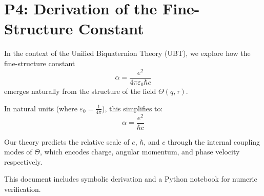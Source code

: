 \documentclass{article}
\begin{document}
\section*{P4: Derivation of the Fine-Structure Constant}

In the context of the Unified Biquaternion Theory (UBT), we explore how the fine-structure constant
\[
\alpha = \frac{e^2}{4 \pi \varepsilon_0 \hbar c}
\]
emerges naturally from the structure of the field $\Theta(q, \tau)$.

In natural units (where $\varepsilon_0 = \frac{1}{4\pi}$), this simplifies to:
\[
\alpha = \frac{e^2}{\hbar c}
\]

Our theory predicts the relative scale of $e$, $\hbar$, and $c$ through the internal coupling modes of $\Theta$,
which encodes charge, angular momentum, and phase velocity respectively.

This document includes symbolic derivation and a Python notebook for numeric verification.
\end{document}
